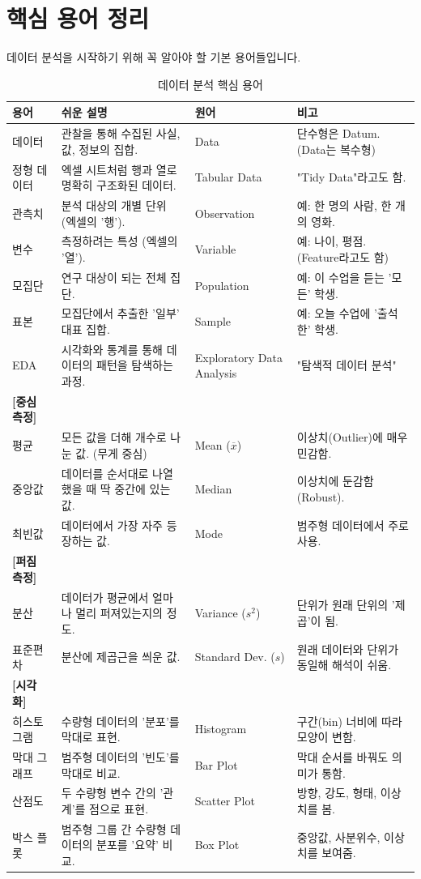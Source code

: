 \documentclass[11pt,a4paper]{book}
\theoremstyle{definition}
\begin{document}
\section{핵심 용어 정리}

데이터 분석을 시작하기 위해 꼭 알아야 할 기본 용어들입니다.

\begin{table}[h!]
\centering
\caption{데이터 분석 핵심 용어}
\label{tab:terms}
\begin{tabular}{@{}lp{5cm}lp{4cm}@{}}
\toprule
\textbf{용어} & \textbf{쉬운 설명} & \textbf{원어} & \textbf{비고} \\
\midrule
데이터 & 관찰을 통해 수집된 사실, 값, 정보의 집합. & Data & 단수형은 Datum. (Data는 복수형) \\
정형 데이터 & 엑셀 시트처럼 행과 열로 명확히 구조화된 데이터. & Tabular Data & "Tidy Data"라고도 함. \\
관측치 & 분석 대상의 개별 단위 (엑셀의 '행'). & Observation & 예: 한 명의 사람, 한 개의 영화. \\
변수 & 측정하려는 특성 (엑셀의 '열'). & Variable & 예: 나이, 평점. (Feature라고도 함) \\
모집단 & 연구 대상이 되는 전체 집단. & Population & 예: 이 수업을 듣는 '모든' 학생. \\
표본 & 모집단에서 추출한 '일부' 대표 집합. & Sample & 예: 오늘 수업에 '출석한' 학생. \\
EDA & 시각화와 통계를 통해 데이터의 패턴을 탐색하는 과정. & Exploratory Data Analysis & "탐색적 데이터 분석" \\
\addlinespace
\textbf{[중심 측정]} & & & \\
평균 & 모든 값을 더해 개수로 나눈 값. (무게 중심) & Mean ($\overline{x}$) & 이상치(Outlier)에 매우 민감함. \\
중앙값 & 데이터를 순서대로 나열했을 때 딱 중간에 있는 값. & Median & 이상치에 둔감함(Robust). \\
최빈값 & 데이터에서 가장 자주 등장하는 값. & Mode & 범주형 데이터에서 주로 사용. \\
\addlinespace
\textbf{[퍼짐 측정]} & & & \\
분산 & 데이터가 평균에서 얼마나 멀리 퍼져있는지의 정도. & Variance ($s^2$) & 단위가 원래 단위의 '제곱'이 됨. \\
표준편차 & 분산에 제곱근을 씌운 값. & Standard Dev. ($s$) & 원래 데이터와 단위가 동일해 해석이 쉬움. \\
\addlinespace
\textbf{[시각화]} & & & \\
히스토그램 & 수량형 데이터의 '분포'를 막대로 표현. & Histogram & 구간(bin) 너비에 따라 모양이 변함. \\
막대 그래프 & 범주형 데이터의 '빈도'를 막대로 비교. & Bar Plot & 막대 순서를 바꿔도 의미가 통함. \\
산점도 & 두 수량형 변수 간의 '관계'를 점으로 표현. & Scatter Plot & 방향, 강도, 형태, 이상치를 봄. \\
박스 플롯 & 범주형 그룹 간 수량형 데이터의 분포를 '요약' 비교. & Box Plot & 중앙값, 사분위수, 이상치를 보여줌. \\
\bottomrule
\end{tabular}
\end{table}
\end{document}
